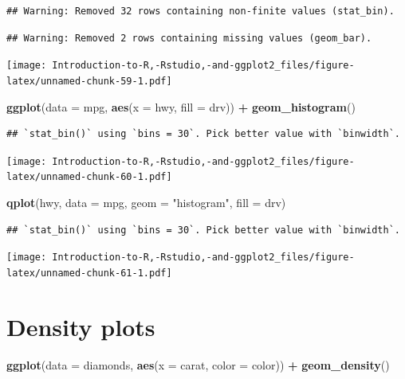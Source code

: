 \documentclass[]{book}
\newenvironment{Shaded}{\begin{snugshade}}{\end{snugshade}}
\newcommand{\DataTypeTok}[1]{\textcolor[rgb]{0.13,0.29,0.53}{#1}}
\newcommand{\KeywordTok}[1]{\textcolor[rgb]{0.13,0.29,0.53}{\textbf{#1}}}
\newcommand{\NormalTok}[1]{#1}
\newcommand{\OperatorTok}[1]{\textcolor[rgb]{0.81,0.36,0.00}{\textbf{#1}}}
\newcommand{\StringTok}[1]{\textcolor[rgb]{0.31,0.60,0.02}{#1}}
\begin{document}
\begin{verbatim}
## Warning: Removed 32 rows containing non-finite values (stat_bin).
\end{verbatim}

\begin{verbatim}
## Warning: Removed 2 rows containing missing values (geom_bar).
\end{verbatim}

\texttt{[image: Introduction-to-R,-Rstudio,-and-ggplot2\_files/figure-latex/unnamed-chunk-59-1.pdf]}

\begin{Shaded}
\begin{Highlighting}[]
\KeywordTok{ggplot}\NormalTok{(}\DataTypeTok{data =}\NormalTok{ mpg, }\KeywordTok{aes}\NormalTok{(}\DataTypeTok{x =}\NormalTok{ hwy, }\DataTypeTok{fill =}\NormalTok{ drv)) }\OperatorTok{+}\StringTok{ }\KeywordTok{geom_histogram}\NormalTok{() }
\end{Highlighting}
\end{Shaded}

\begin{verbatim}
## `stat_bin()` using `bins = 30`. Pick better value with `binwidth`.
\end{verbatim}

\texttt{[image: Introduction-to-R,-Rstudio,-and-ggplot2\_files/figure-latex/unnamed-chunk-60-1.pdf]}

\begin{Shaded}
\begin{Highlighting}[]
\KeywordTok{qplot}\NormalTok{(hwy, }\DataTypeTok{data =}\NormalTok{ mpg, }\DataTypeTok{geom =} \StringTok{"histogram"}\NormalTok{, }\DataTypeTok{fill =}\NormalTok{ drv)}
\end{Highlighting}
\end{Shaded}

\begin{verbatim}
## `stat_bin()` using `bins = 30`. Pick better value with `binwidth`.
\end{verbatim}

\texttt{[image: Introduction-to-R,-Rstudio,-and-ggplot2\_files/figure-latex/unnamed-chunk-61-1.pdf]}

\hypertarget{density-plots}{%
\section{Density plots}\label{density-plots}}

\begin{Shaded}
\begin{Highlighting}[]
\KeywordTok{ggplot}\NormalTok{(}\DataTypeTok{data =}\NormalTok{ diamonds, }\KeywordTok{aes}\NormalTok{(}\DataTypeTok{x =}\NormalTok{ carat, }\DataTypeTok{color =}\NormalTok{ color)) }\OperatorTok{+}\StringTok{ }\KeywordTok{geom_density}\NormalTok{() }
\end{Highlighting}
\end{Shaded}
\end{document}
